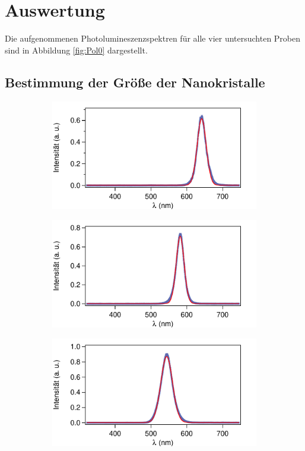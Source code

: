 \newpage
\section{Auswertung}
\label{sec:evaluation}
Die aufgenommenen Photolumineszenzspektren für alle vier untersuchten Proben sind in Abbildung \ref{fig:Pol0}
dargestellt. 
\subsection{Bestimmung der Größe der Nanokristalle}
\begin{figure}[H]
    \centering
    \begin{subfigure}{0.49\textwidth}
        \includegraphics[width=\textwidth]{bilder/N1_Pol0.pdf}
        \caption{}
        \label{fig:A1}
    \end{subfigure}
    \begin{subfigure}{0.49\textwidth}
        \includegraphics[width=\textwidth]{bilder/Nr2_Pol0.pdf}
        \caption{}
        \label{fig:A2}
    \end{subfigure}
    \begin{subfigure}{0.49\textwidth}
        \includegraphics[width=\textwidth]{bilder/Nr3_Pol0.pdf}

\end{subfigure}
\end{figure}
